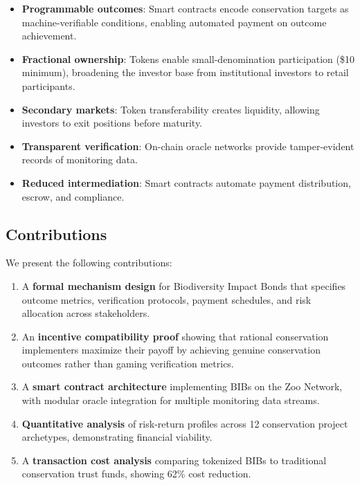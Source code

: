 \begin{itemize}
  \item \textbf{Programmable outcomes}: Smart contracts encode
    conservation targets as machine-verifiable conditions, enabling
    automated payment on outcome achievement.
  \item \textbf{Fractional ownership}: Tokens enable small-denomination
    participation (\$10 minimum), broadening the investor base from
    institutional investors to retail participants.
  \item \textbf{Secondary markets}: Token transferability creates
    liquidity, allowing investors to exit positions before maturity.
  \item \textbf{Transparent verification}: On-chain oracle networks
    provide tamper-evident records of monitoring data.
  \item \textbf{Reduced intermediation}: Smart contracts automate
    payment distribution, escrow, and compliance.
\end{itemize}

\subsection{Contributions}

We present the following contributions:

\begin{enumerate}
  \item A \textbf{formal mechanism design} for Biodiversity Impact Bonds
    that specifies outcome metrics, verification protocols, payment
    schedules, and risk allocation across stakeholders.

  \item An \textbf{incentive compatibility proof} showing that rational
    conservation implementers maximize their payoff by achieving genuine
    conservation outcomes rather than gaming verification metrics.

  \item A \textbf{smart contract architecture} implementing BIBs on the
    Zoo Network, with modular oracle integration for multiple
    monitoring data streams.

  \item \textbf{Quantitative analysis} of risk-return profiles across 12
    conservation project archetypes, demonstrating financial viability.

  \item A \textbf{transaction cost analysis} comparing tokenized BIBs to
    traditional conservation trust funds, showing 62\% cost reduction.
\end{enumerate}


